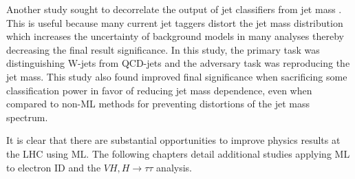 Another study sought to decorrelate the output of jet classifiers from jet mass \cite{jet_decorr}. This is useful because many current jet taggers distort the jet mass distribution which increases the uncertainty of background models in many analyses thereby decreasing the final result significance. In this study, the primary task was distinguishing W-jets from QCD-jets and the adversary task was reproducing the jet mass. This study also found improved final significance when sacrificing some classification power in favor of reducing jet mass dependence, even when compared to non-ML methods for preventing distortions of the jet mass spectrum.

\pagebreak

It is clear that there are substantial opportunities to improve physics results at the LHC using ML. The following chapters detail additional studies applying ML to electron ID and the $VH,H\rightarrow\tau\tau$ analysis.

